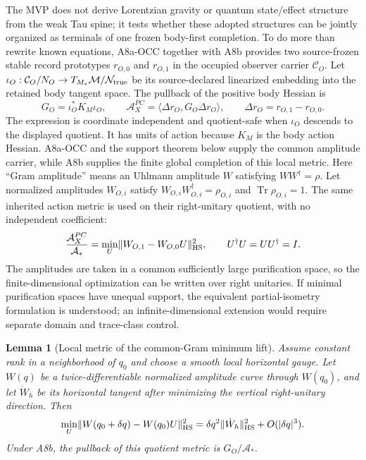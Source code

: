 \documentclass[11pt]{article}
\newtheorem{lemma}{Lemma}
\begin{document}
The MVP does not derive Lorentzian gravity or quantum state/effect structure
from the weak Tau spine; it tests whether these adopted structures can be
jointly organized as terminals of one frozen body-first completion.  To do
more than rewrite known equations, A8a-OCC together with A8b
provides two source-frozen stable record prototypes \(r_{O,0}\) and
\(r_{O,1}\) in the occupied observer carrier \(\mathcal C_O\).  Let
\(\iota_O:\mathcal C_O/N_O\to T_{M_*}\mathcal M/\mathcal N_{\rm true}\)
be its source-declared linearized embedding into the retained body tangent space.  The
pullback of the positive body Hessian is
\begin{equation}
  G_O=\iota_O^*K_M\iota_O,
  \qquad
  \mathcal A_X^{PC}
  =\langle\Delta r_O,G_O\Delta r_O\rangle,
  \qquad
  \Delta r_O=r_{O,1}-r_{O,0}.
  \label{eq:observer-pullback-metric}
\end{equation}
The expression is coordinate independent and quotient-safe when \(\iota_O\)
descends to the displayed quotient.  It has units of action because \(K_M\)
is the body action Hessian.  A8a-OCC and the support theorem below supply the
common amplitude carrier, while A8b supplies the finite global completion of
this local metric.  Here ``Gram amplitude'' means an Uhlmann
amplitude \(W\) satisfying \(WW^\dagger=\rho\).  Let normalized amplitudes
\(W_{O,i}\) satisfy \(W_{O,i}W_{O,i}^\dagger=\rho_{O,i}\) and
\(\operatorname{Tr}\rho_{O,i}=1\).  The same inherited action metric is used
on their right-unitary quotient, with no independent coefficient:
\begin{equation}
 \frac{\mathcal A_X^{PC}}{\mathcal A_*}
 =\min_U\lVert W_{O,1}-W_{O,0}U\rVert_{\rm HS}^2,
 \qquad U^\dagger U=UU^\dagger=I.
 \label{eq:common-gram-minimum-lift}
\end{equation}
The amplitudes are taken in a common sufficiently large purification space, so
the finite-dimensional optimization can be written over right unitaries.  If
minimal purification spaces have unequal support, the equivalent
partial-isometry formulation is understood; an infinite-dimensional extension
would require separate domain and trace-class control.

\begin{lemma}[Local metric of the common-Gram minimum lift]
Assume constant rank in a neighborhood of \(q_0\) and choose a smooth local
horizontal gauge.  Let \(W(q)\) be a twice-differentiable normalized amplitude
curve through \(W(q_0)\),
and let \(\dot W_h\) be its horizontal tangent after minimizing the vertical
right-unitary direction.  Then
\begin{equation}
 \min_U\lVert W(q_0+\delta q)-W(q_0)U\rVert_{\rm HS}^2
 =\delta q^2\lVert\dot W_h\rVert_{\rm HS}^2+O(|\delta q|^3).
 \label{eq:minimum-lift-second-variation}
\end{equation}
Under A8b, the pullback of this quotient metric is
\(G_O/\mathcal A_*\).
\end{lemma}
\end{document}
